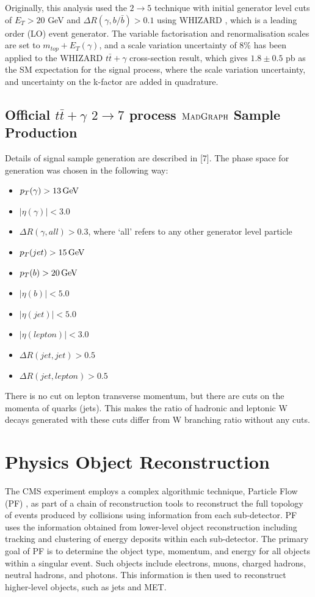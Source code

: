 Originally, this analysis used the $2 \to 5$ technique with initial generator level cuts of $E_T > 20$ GeV and $\Delta R(\gamma, b/\bar{b}) > 0.1$ using WHIZARD \cite{WHIZARD}, which is a leading order (LO) event generator. The variable factorisation and renormalisation scales are set to $m_{top} + E_T(\gamma)$, and a scale variation uncertainty of 8\% has been applied to the WHIZARD $t\bar{t}+\gamma$ cross-section result, which gives $1.8 \pm 0.5$ pb as the SM expectation for the signal process, where the scale variation uncertainty, and uncertainty on the k-factor are added in quadrature. 


\subsection{Official $t\bar{t}+\gamma$ $2 \to 7$ process $\textsc{MadGraph}$ Sample Production}

Details of signal sample generation are described in [7]. The phase space for generation was
chosen in the following way:

\begin{itemize}
	\item $p_T (\gamma) > 13 \,\text{Ge\hspace{-.08em}V}$
	\item $|\eta(\gamma)| < 3.0$
	\item $\Delta R (\gamma, all) > 0.3$, where `all' refers to any other generator level particle
	\item $p_T (jet) > 15 \,\text{Ge\hspace{-.08em}V}$
	\item $p_T (b) > 20 \,\text{Ge\hspace{-.08em}V}$
	\item $|\eta (b)| < 5.0$
	\item $|\eta (jet)| < 5.0$
	\item $| \eta (lepton)| < 3.0$
	\item $\Delta R (jet, jet) > 0.5$
	\item $\Delta R (jet, lepton) > 0.5$
\end{itemize}

There is no cut on lepton transverse momentum, but there are cuts on the momenta of quarks (jets). This makes the ratio of hadronic and leptonic W decays generated with these cuts differ from W branching ratio without any cuts.

\section{Physics Object Reconstruction} \label{sec-ParticleObjectReconstruction}

The CMS experiment employs a complex algorithmic technique, Particle Flow (PF) \cite{CMS-PAS-PFT-09-001}, as part of a chain of reconstruction tools to reconstruct the full topology of events produced by collisions using information from each sub-detector. PF uses the information obtained from lower-level object reconstruction including tracking and clustering of energy deposits within each sub-detector. The primary goal of PF is to determine the object type, momentum, and energy for all objects within a singular event. Such objects include electrons, muons,  charged hadrons, neutral hadrons, and photons. This information is then used to reconstruct higher-level objects, such as jets and MET.

